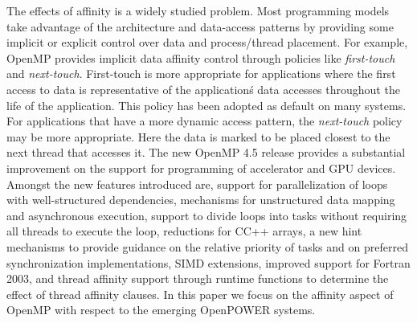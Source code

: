 The effects of affinity is a widely studied problem. Most programming models take advantage of the architecture and data-access patterns by providing some implicit or explicit control over data and process/thread placement. For example, OpenMP provides implicit data affinity control through policies like \textit{first-touch} and \textit{next-touch}. First-touch is more appropriate for applications where the first access to data is representative of the application\'s data accesses throughout the life of the application. This policy has been adopted as default on many systems. For applications that have a more dynamic access pattern, the \textit{next-touch} policy may be more appropriate. Here the data is marked to be placed closest to the next thread that accesses it. The new OpenMP 4.5 release provides a substantial improvement on the support for programming of accelerator and GPU devices. Amongst the new features introduced are, support for parallelization of loops with well-structured dependencies, mechanisms for unstructured data mapping and asynchronous execution, support to divide loops into tasks without requiring all threads to execute the loop, reductions for C\/C++ arrays, a new hint mechanisms to provide guidance on the relative priority of tasks and on preferred synchronization implementations, SIMD extensions, improved support for Fortran 2003, and
thread affinity support through runtime functions to determine the effect of thread affinity clauses. In this paper we focus on the affinity aspect of OpenMP with respect to the emerging OpenPOWER systems.
